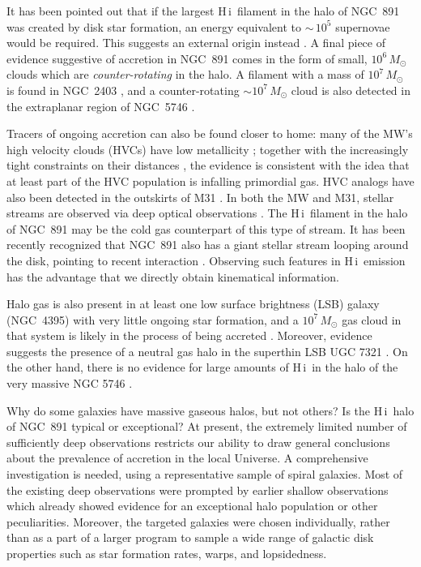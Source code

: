 \documentclass[oldversion]{aa}
\newcommand{\HI}{{\sc H\,i}}
\begin{document}
It has been pointed out that if the largest \HI\ filament in the halo of NGC~891 was created by disk star formation, an energy equivalent to $\sim\,10^5$ supernovae would be required. This suggests an external origin instead \citep{oosterloo_etal_2007}. A final piece of evidence suggestive of accretion in NGC~891 comes in the form of small, $10^6\,M_{\odot}$ clouds which are {\em counter-rotating} in the halo. A filament with a mass of $10^7\,M_{\odot}$ is found in NGC~2403 \citep{fraternali_etal_2002}, and a counter-rotating $\sim10^7\,M_{\odot}$ cloud is also detected in the extraplanar region of NGC~5746 \citep{rand_benjamin_2008}.

Tracers of ongoing accretion can also be found closer to home: many of the MW's high velocity clouds (HVCs) have low metallicity \citep{tripp_etal_2003}; together with the increasingly tight constraints on their distances \citep{wakker_etal_2007,wakker_etal_2008}, the evidence is consistent with the idea that at least part of the HVC population is infalling primordial gas. HVC analogs have also been detected in the outskirts of M31 \citep{thilker_etal_2004}. In both the MW and M31, stellar streams are observed via deep optical observations \citep{belokurov_etal_2007,ferguson_2007}. The \HI\ filament in the halo of NGC~891 may be the cold gas counterpart of this type of stream. It has been recently recognized that NGC~891 also has a giant stellar stream looping around the disk, pointing to recent interaction \citep{mouhcine_etal_2010}. Observing such features in \HI\ emission has the advantage that we directly obtain kinematical information.

Halo gas is also present in at least one low surface brightness (LSB) galaxy (NGC~4395) with very little ongoing star formation, and a $10^7\,M_{\odot}$ gas cloud in that system is likely in the process of being accreted \citep{heald_oosterloo_2008}. Moreover, evidence suggests the presence of a neutral gas halo in the superthin LSB UGC 7321 \citep{matthews_wood_2003}. On the other hand, there is no evidence for large amounts of \HI\ in the halo of the very massive NGC 5746 \citep{rand_benjamin_2008}.

Why do some galaxies have massive gaseous halos, but not others? Is the \HI\ halo of NGC~891 typical or exceptional? At present, the extremely limited number of sufficiently deep observations restricts our ability to draw general conclusions about the prevalence of accretion in the local Universe. A comprehensive investigation is needed, using a representative sample of spiral galaxies. Most of the existing deep observations were prompted by earlier shallow observations which already showed evidence for an exceptional halo population or other peculiarities. Moreover, the targeted galaxies were chosen individually, rather than as a part of a larger program to sample a wide range of galactic disk properties such as star formation rates, warps, and lopsidedness.
\end{document}
